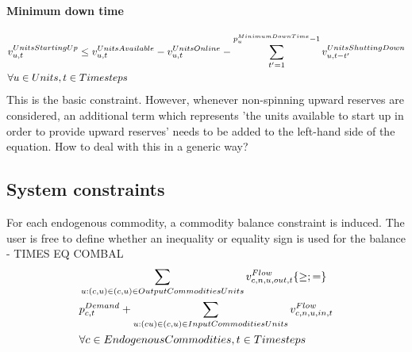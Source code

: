 \paragraph{Minimum down time}
\begin{align} \label{eq:minimumdowntime}
&\vUnitsStartingUp \le \vUnitsAvailable - \vUnitsOnline - \sum_{\timestep'=1}^{\pMinimumDownTime - 1} \vUnitsShuttingDown[\unit,\timestep-\timestep'] \nonumber \\
& \forall \units, \timesteps
\end{align}
{\color{red} This is the basic constraint. However, whenever non-spinning upward reserves are considered, an additional term which represents 'the units available to start up in order to provide upward reserves' needs to be added to the left-hand side of the equation. How to deal with this in a generic way?}






\subsection{System constraints}

For each endogenous commodity, a commodity balance constraint is induced. The user is free to define whether an inequality or equality sign is used for the balance - TIMES EQ COMBAL
\begin{align} \label{eq:commodity_balance}
&\sum_{\unit : (\commodity,\unit) \in \OutputCommoditiesUnits} \vFlow[\commodity,\node,\unit,out,\timestep] \{\ge;=\} \nonumber \\ 
&\pDemand + \sum_{\unit: (\commodity\unit) \in \InputCommoditiesUnits} \vFlow[\commodity,\node,\unit,in,\timestep] \nonumber \\ 
& \forall \EndogenousCommodities, \timesteps 
\end{align}


